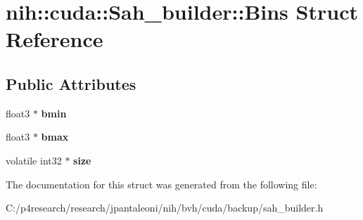 \hypertarget{structnih_1_1cuda_1_1_sah__builder_1_1_bins}{
\section{nih\-:\-:cuda\-:\-:\-Sah\-\_\-builder\-:\-:\-Bins \-Struct \-Reference}
\label{structnih_1_1cuda_1_1_sah__builder_1_1_bins}
}
\subsection*{\-Public \-Attributes}
\begin{DoxyCompactItemize}
\item 
\hypertarget{structnih_1_1cuda_1_1_sah__builder_1_1_bins_a6845d66cf1473f8ff732fb7ad1014fa3}{
float3 $\ast$ {\bfseries bmin}}
\label{structnih_1_1cuda_1_1_sah__builder_1_1_bins_a6845d66cf1473f8ff732fb7ad1014fa3}

\item 
\hypertarget{structnih_1_1cuda_1_1_sah__builder_1_1_bins_a91edfaf7b718dc0a34cb3e6a302c92e7}{
float3 $\ast$ {\bfseries bmax}}
\label{structnih_1_1cuda_1_1_sah__builder_1_1_bins_a91edfaf7b718dc0a34cb3e6a302c92e7}

\item 
\hypertarget{structnih_1_1cuda_1_1_sah__builder_1_1_bins_a85acf005f8b3611c6cfdaa95162591f0}{
volatile int32 $\ast$ {\bfseries size}}
\label{structnih_1_1cuda_1_1_sah__builder_1_1_bins_a85acf005f8b3611c6cfdaa95162591f0}

\end{DoxyCompactItemize}


\-The documentation for this struct was generated from the following file\-:\begin{DoxyCompactItemize}
\item 
\-C\-:/p4research/research/jpantaleoni/nih/bvh/cuda/backup/sah\-\_\-builder.\-h\end{DoxyCompactItemize}
